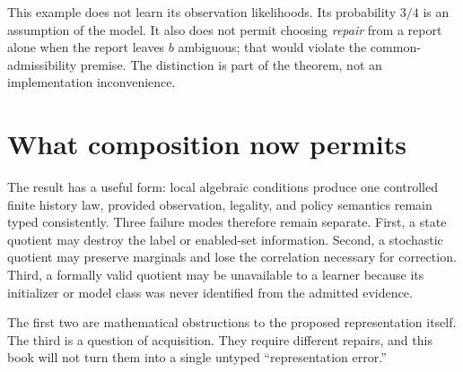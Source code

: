 This example does not learn its observation likelihoods. Its probability $3/4$ is an assumption of the model. It also does not permit choosing \emph{repair} from a report alone when the report leaves $b$ ambiguous; that would violate the common-admissibility premise. The distinction is part of the theorem, not an implementation inconvenience.

\section{What composition now permits}
The result has a useful form: local algebraic conditions produce one controlled finite history law, provided observation, legality, and policy semantics remain typed consistently. Three failure modes therefore remain separate. First, a state quotient may destroy the label or enabled-set information. Second, a stochastic quotient may preserve marginals and lose the correlation necessary for correction. Third, a formally valid quotient may be unavailable to a learner because its initializer or model class was never identified from the admitted evidence.

The first two are mathematical obstructions to the proposed representation itself. The third is a question of acquisition. They require different repairs, and this book will not turn them into a single untyped ``representation error.''
